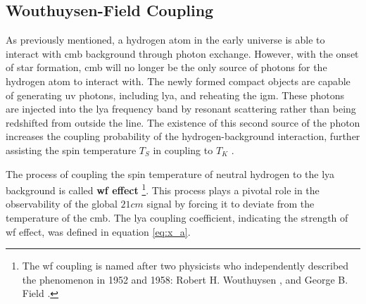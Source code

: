 \documentclass[12pt, TexShade, letterpaper]{report}
\begin{document}
\subsection{Wouthuysen-Field Coupling}
As previously mentioned, a hydrogen atom in the early universe is able to interact with \gls{cmb} background through photon exchange. However, with the onset of star formation, \gls{cmb} will no longer be the only source of photons for the hydrogen atom to interact with. The newly formed compact objects are capable of generating \gls{uv} photons, including \gls{lya}, and reheating the \gls{igm}. These photons are injected into the \gls{lya} frequency band by resonant scattering rather than being redshifted from outside the line. The existence of this second source of the photon increases the coupling probability of the hydrogen-background interaction, further assisting the spin temperature $T_S$ in coupling to $T_K$ \cite{21century, low_frequency}.\par
The process of coupling the spin temperature of neutral hydrogen to the \gls{lya} background is called \textbf{\gls{wf} effect} \cite{barkana2001beginning}\footnote{The \gls{wf} coupling is named after two physicists who independently described the phenomenon in 1952 and 1958: Robert H. Wouthuysen \cite{wouthuysen_original}, and George B. Field \cite{field_original}.}. This process plays a pivotal role in the observability of the global $21cm$ signal by forcing it to deviate from the temperature of the \gls{cmb}. The \gls{lya} coupling coefficient, indicating the strength of \gls{wf} effect, was defined in equation \ref{eq:x_a}. \par
\end{document}
